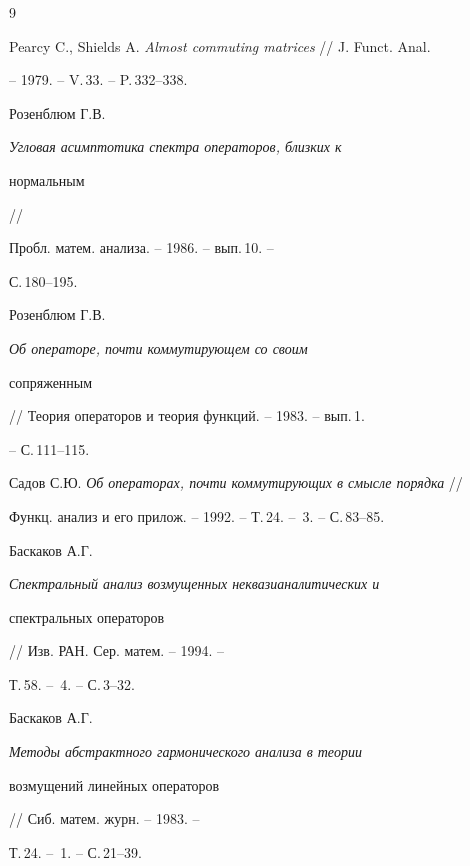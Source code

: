 \begin{thebibliography}{9}







Pearcy C., Shields A. {\em Almost commuting matrices} // J. Funct. Anal.


-- 1979. -- V.\,33. -- P.\,332--338.




Розенблюм Г.В. {\em Угловая асимптотика спектра операторов, близких к


нормальным} // \linebreak




Пробл. матем. анализа. -- 1986. -- вып.\,10. --


С.\,180--195.




Розенблюм Г.В. {\em Об операторе, почти коммутирующем со своим


сопряженным} // Теория операторов и теория функций. -- 1983. -- вып.\,1.


-- С.\,111--115.




Садов С.Ю. {\em Об операторах, почти коммутирующих в смысле порядка} //


Функц. анализ и его прилож. -- 1992. -- Т.\,24. -- \No\,3. -- С.\,83--85.




Баскаков А.Г. {\em Спектральный анализ возмущенных неквазианалитических и


спектральных операторов} // Изв. РАН. Сер. матем. -- 1994. --


Т.\,58. -- \No\,4. -- С.\,3--32.




Баскаков А.Г. {\em Методы абстрактного гармонического анализа в теории


возмущений линейных операторов} // Сиб. матем. журн. -- 1983. --


Т.\,24. -- \No\,1. -- С.\,21--39.





\end{thebibliography}





\vskip 2cm















